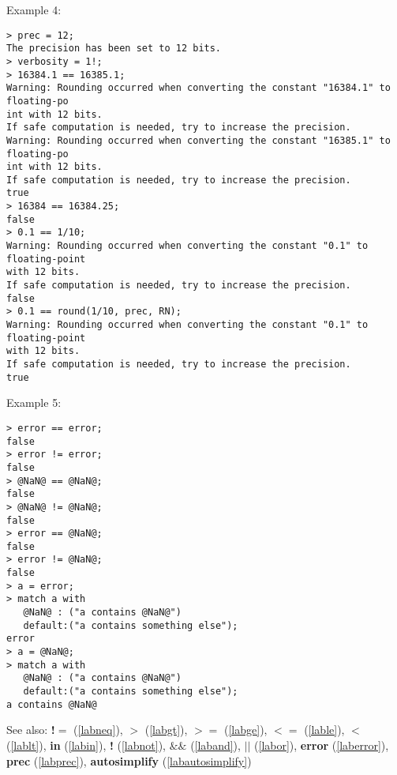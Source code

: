 \noindent Example 4: 
\begin{center}\begin{minipage}{15cm}\begin{Verbatim}[frame=single]
> prec = 12;
The precision has been set to 12 bits.
> verbosity = 1!;
> 16384.1 == 16385.1;
Warning: Rounding occurred when converting the constant "16384.1" to floating-po
int with 12 bits.
If safe computation is needed, try to increase the precision.
Warning: Rounding occurred when converting the constant "16385.1" to floating-po
int with 12 bits.
If safe computation is needed, try to increase the precision.
true
> 16384 == 16384.25;
false
> 0.1 == 1/10;
Warning: Rounding occurred when converting the constant "0.1" to floating-point 
with 12 bits.
If safe computation is needed, try to increase the precision.
false
> 0.1 == round(1/10, prec, RN);
Warning: Rounding occurred when converting the constant "0.1" to floating-point 
with 12 bits.
If safe computation is needed, try to increase the precision.
true
\end{Verbatim}
\end{minipage}\end{center}
\noindent Example 5: 
\begin{center}\begin{minipage}{15cm}\begin{Verbatim}[frame=single]
> error == error;
false
> error != error;
false
> @NaN@ == @NaN@;
false
> @NaN@ != @NaN@;
false
> error == @NaN@;
false
> error != @NaN@;
false
> a = error;
> match a with
   @NaN@ : ("a contains @NaN@")
   default:("a contains something else");
error
> a = @NaN@;
> match a with
   @NaN@ : ("a contains @NaN@")
   default:("a contains something else");
a contains @NaN@
\end{Verbatim}
\end{minipage}\end{center}
See also: \textbf{!$=$} (\ref{labneq}), \textbf{$>$} (\ref{labgt}), \textbf{$>=$} (\ref{labge}), \textbf{$<=$} (\ref{lable}), \textbf{$<$} (\ref{lablt}), \textbf{in} (\ref{labin}), \textbf{!} (\ref{labnot}), \textbf{$\&\&$} (\ref{laband}), \textbf{$||$} (\ref{labor}), \textbf{error} (\ref{laberror}), \textbf{prec} (\ref{labprec}), \textbf{autosimplify} (\ref{labautosimplify})
